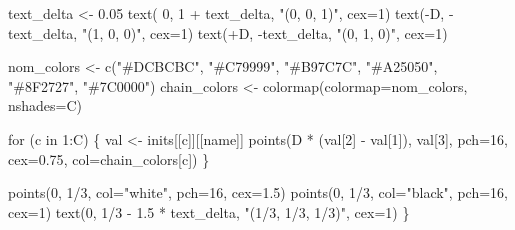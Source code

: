 \documentclass[
  letterpaper,
  DIV=11,
  numbers=noendperiod]{scrartcl}
\newenvironment{Shaded}{\begin{snugshade}}{\end{snugshade}}
\newcommand{\AttributeTok}[1]{\textcolor[rgb]{0.40,0.45,0.13}{#1}}
\newcommand{\ControlFlowTok}[1]{\textcolor[rgb]{0.00,0.23,0.31}{#1}}
\newcommand{\DecValTok}[1]{\textcolor[rgb]{0.68,0.00,0.00}{#1}}
\newcommand{\FloatTok}[1]{\textcolor[rgb]{0.68,0.00,0.00}{#1}}
\newcommand{\FunctionTok}[1]{\textcolor[rgb]{0.28,0.35,0.67}{#1}}
\newcommand{\NormalTok}[1]{\textcolor[rgb]{0.00,0.23,0.31}{#1}}
\newcommand{\OtherTok}[1]{\textcolor[rgb]{0.00,0.23,0.31}{#1}}
\newcommand{\SpecialCharTok}[1]{\textcolor[rgb]{0.37,0.37,0.37}{#1}}
\newcommand{\StringTok}[1]{\textcolor[rgb]{0.13,0.47,0.30}{#1}}
\begin{document}
\begin{Shaded}
\begin{Highlighting}[]
\NormalTok{  text\_delta }\OtherTok{\textless{}{-}} \FloatTok{0.05}
  \FunctionTok{text}\NormalTok{( }\DecValTok{0}\NormalTok{, }\DecValTok{1} \SpecialCharTok{+}\NormalTok{ text\_delta, }\StringTok{"(0, 0, 1)"}\NormalTok{, }\AttributeTok{cex=}\DecValTok{1}\NormalTok{)}
  \FunctionTok{text}\NormalTok{(}\SpecialCharTok{{-}}\NormalTok{D, }\SpecialCharTok{{-}}\NormalTok{text\_delta, }\StringTok{"(1, 0, 0)"}\NormalTok{, }\AttributeTok{cex=}\DecValTok{1}\NormalTok{)}
  \FunctionTok{text}\NormalTok{(}\SpecialCharTok{+}\NormalTok{D, }\SpecialCharTok{{-}}\NormalTok{text\_delta, }\StringTok{"(0, 1, 0)"}\NormalTok{, }\AttributeTok{cex=}\DecValTok{1}\NormalTok{)}

\NormalTok{  nom\_colors }\OtherTok{\textless{}{-}} \FunctionTok{c}\NormalTok{(}\StringTok{"\#DCBCBC"}\NormalTok{, }\StringTok{"\#C79999"}\NormalTok{, }\StringTok{"\#B97C7C"}\NormalTok{,}
                  \StringTok{"\#A25050"}\NormalTok{, }\StringTok{"\#8F2727"}\NormalTok{, }\StringTok{"\#7C0000"}\NormalTok{)}
\NormalTok{  chain\_colors }\OtherTok{\textless{}{-}} \FunctionTok{colormap}\NormalTok{(}\AttributeTok{colormap=}\NormalTok{nom\_colors, }\AttributeTok{nshades=}\NormalTok{C)}

  \ControlFlowTok{for}\NormalTok{ (c }\ControlFlowTok{in} \DecValTok{1}\SpecialCharTok{:}\NormalTok{C) \{}
\NormalTok{    val }\OtherTok{\textless{}{-}}\NormalTok{ inits[[c]][[name]]}
    \FunctionTok{points}\NormalTok{(D }\SpecialCharTok{*}\NormalTok{ (val[}\DecValTok{2}\NormalTok{] }\SpecialCharTok{{-}}\NormalTok{ val[}\DecValTok{1}\NormalTok{]), val[}\DecValTok{3}\NormalTok{],}
           \AttributeTok{pch=}\DecValTok{16}\NormalTok{, }\AttributeTok{cex=}\FloatTok{0.75}\NormalTok{, }\AttributeTok{col=}\NormalTok{chain\_colors[c])}
\NormalTok{  \}}

  \FunctionTok{points}\NormalTok{(}\DecValTok{0}\NormalTok{, }\DecValTok{1}\SpecialCharTok{/}\DecValTok{3}\NormalTok{, }\AttributeTok{col=}\StringTok{"white"}\NormalTok{, }\AttributeTok{pch=}\DecValTok{16}\NormalTok{, }\AttributeTok{cex=}\FloatTok{1.5}\NormalTok{)}
  \FunctionTok{points}\NormalTok{(}\DecValTok{0}\NormalTok{, }\DecValTok{1}\SpecialCharTok{/}\DecValTok{3}\NormalTok{, }\AttributeTok{col=}\StringTok{"black"}\NormalTok{, }\AttributeTok{pch=}\DecValTok{16}\NormalTok{, }\AttributeTok{cex=}\DecValTok{1}\NormalTok{)}
  \FunctionTok{text}\NormalTok{(}\DecValTok{0}\NormalTok{, }\DecValTok{1}\SpecialCharTok{/}\DecValTok{3} \SpecialCharTok{{-}} \FloatTok{1.5} \SpecialCharTok{*}\NormalTok{ text\_delta, }\StringTok{"(1/3, 1/3, 1/3)"}\NormalTok{, }\AttributeTok{cex=}\DecValTok{1}\NormalTok{)}
\NormalTok{\}}


\end{Highlighting}
\end{Shaded}
\end{document}
